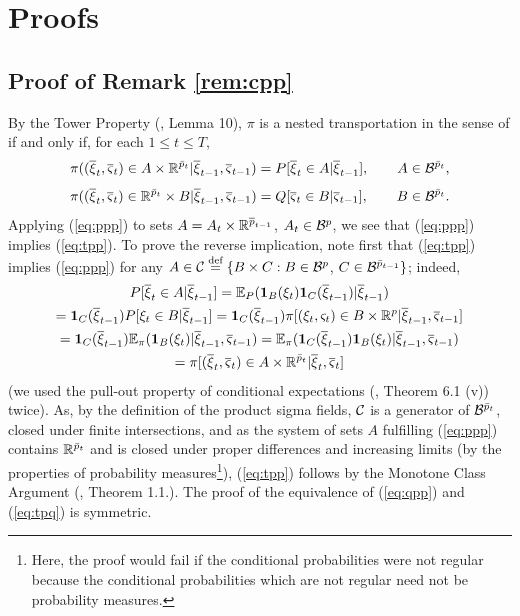 \documentclass{article}              %
\begin{document}
\section{Proofs}

\subsection{Proof of Remark \ref{rem:cpp}}

\label{app:cpp}

By the Tower Property (\cite{pflug2012distance}, Lemma 10), $\pi$
is a nested transportation in the sense of \cite{pflug2012distance}
if and only if, for each $1\leq t\leq T$,
\begin{equation}
\pi((\overline{\xi}_{t},\overline{\varsigma}_{t})\in A\times\mathbb{R}^{\bar{p}_{t}}|\overline{\xi}_{t-1},\overline{\varsigma}_{t-1})=P[\overline{\xi}_{t}\in A|\overline{\xi}_{t-1}],\qquad A\in\mathcal{B}^{\bar{p}_{t}},\label{eq:ppp}
\end{equation}
\begin{equation}
\pi((\overline{\xi}_{t},\overline{\varsigma}_{t})\in\mathbb{R}^{\bar{p}_{t}}\times B|\overline{\xi}_{t-1},\overline{\varsigma}_{t-1})=Q[\overline{\varsigma}_{t}\in B|\overline{\varsigma}_{t-1}],\qquad B\in\mathcal{B}^{\bar{p}_{t}}.\label{eq:qpp}
\end{equation}
Applying (\ref{eq:ppp}) to sets $A=A_{t}\times\mathbb{R}^{\overline{p}_{t-1}}$,
$A_{t}\in\mathcal{B}^{p}$, 
we see that (\ref{eq:ppp}) implies (\ref{eq:tpp}). To prove the
reverse implication, note first that (\ref{eq:tpp}) implies (\ref{eq:ppp})
for any $A\in\mathcal{C}\stackrel{\text{\rm def}}{=}\{B\times C:B\in\mathcal{B}^{p}$, $C\in\mathcal{B}^{\bar{p}_{t-1}}\}$;
indeed, 
\begin{multline*}
P[\overline{\xi}_{t}\in A|\overline{\xi}_{t-1}]=\mathbb{E}_{P}(\mathbf{1}_{B}(\xi_{t})\mathbf{1}_{C}(\overline{\xi}_{t-1})|\overline{\xi}_{t-1})\\
=\mathbf{1}_{C}(\overline{\xi}_{t-1})P[\xi_{t}\in B|\overline{\xi}_{t-1}]=\mathbf{1}_{C}(\overline{\xi}_{t-1})\pi[(\xi_{t},\varsigma_{t})\in B\times\mathbb{R}^{p}|\overline{\xi}_{t-1},\overline{\varsigma}_{t-1}]\\
=\mathbf{1}_{C}(\overline{\xi}_{t-1})\mathbb{E}_{\pi}(\mathbf{1}_{B}(\xi_{t})|\overline{\xi}_{t-1},\overline{\varsigma}_{t-1})=\mathbb{E}_{\pi}(\mathbf{1}_{C}(\overline{\xi}_{t-1})\mathbf{1}_{B}(\xi_{t})|\overline{\xi}_{t-1},\overline{\varsigma}_{t-1})\\
=\pi[(\overline{\xi}_{t},\overline{\varsigma}_{t})\in A\times\mathbb{R}^{\bar{p}_{t}}|\overline{\xi}_{t},\overline{\varsigma}_{t}]
\end{multline*}
(we used the pull-out property of conditional expectations (\cite{Kallenberg02}, Theorem 6.1 (v)) twice).
As, by the definition of the product sigma fields, $\mathcal{C}$ is a generator
of $\mathcal{B}^{\bar{p}_{t}}$, closed under finite intersections, and as
the system of sets $A$ fulfilling (\ref{eq:ppp}) contains $\mathbb{R}^{\bar{p}_{t}}$
and is closed under proper differences and increasing limits (by the
properties of probability measures\footnote{Here, the proof would fail if the conditional probabilities were not
regular because the conditional probabilities which are not regular
need not be probability measures.}), (\ref{eq:tpp}) follows by the Monotone Class Argument (\cite{Kallenberg02},
Theorem 1.1.). The proof of the equivalence of (\ref{eq:qpp}) and
(\ref{eq:tpq}) is symmetric. 
\end{document}
